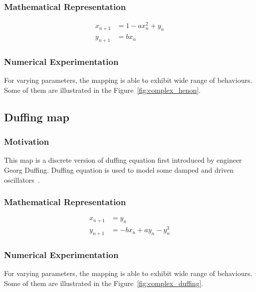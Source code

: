 \subsubsection{Mathematical Representation}
\begin{equation}
\begin{split}
    x_{n+1} &=  1 - a x_{n}^2 + y_{n} \\
    y_{n+1} &=  b x_{n}
\end{split}
\end{equation}

\subsubsection{Numerical Experimentation}
For varying parameters, the mapping is able to exhibit wide range of behaviours.
Some of them are illustrated in the Figure~\ref{fig:complex_henon}.

\subsection{Duffing map}

\subsubsection{Motivation}

This map is a discrete version of duffing equation first introduced by engineer Georg Duffing.
Duffing equation is used to model some damped and driven oscillators~\cite{Urrea2022}.


\subsubsection{Mathematical Representation}
\begin{equation}
\begin{split}
    x_{n+1} &=  y_{n} \\
    y_{n+1} &=  -b x_{n} + a y_{n} - y_{n}^3
\end{split}
\end{equation}

\subsubsection{Numerical Experimentation}
For varying parameters, the mapping is able to exhibit wide range of behaviours.
Some of them are illustrated in the Figure~\ref{fig:complex_duffing}.

\endinput